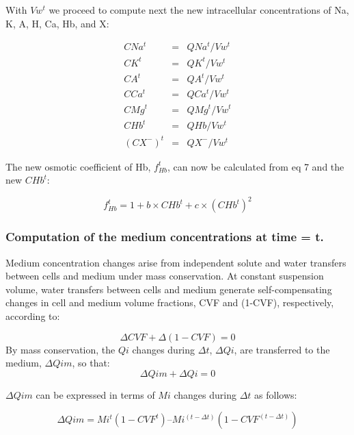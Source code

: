 \documentclass[a4paper]{article}
\newcommand{\cell}[1]{C#1}
\newcommand{\CNa}{\cell{Na}}
\newcommand{\CK}{\cell{K}}
\newcommand{\CA}{\cell{A}}
\newcommand{\CHb}{\cell{Hb}}
\newcommand{\CCa}{\cell{Ca}}
\newcommand{\CMg}{\cell{Mg}}
\newcommand{\CX}{\cell{X}}
\begin{document}
With $Vw^t$ we proceed to compute next the new intracellular concentrations of Na, K, A, H, Ca, Hb, and X:

\setcounter{equation}{0}
\renewcommand{\theequation}{24\alph{equation}}

\begin{eqnarray}
\CNa^t &=& QNa^t/Vw^t \\
\CK^t &=& QK^t/Vw^t \\
\CA^t &=& QA^t/Vw^t  \\
\CCa^t &=& QCa^t/Vw^t  \\
\CMg^t &=& QMg^t/Vw^t  \\
\CHb^t &=& QHb/Vw^t \\
(\CX^{-})^t &=& QX^{-} /Vw^t  
\end{eqnarray}

The new osmotic coefficient of Hb, $f_{Hb}^t$, can now be calculated from eq 7 and the new $\CHb^t$:

\setcounter{equation}{24}
\renewcommand{\theequation}{\arabic{equation}}

\begin{equation}
f_{Hb}^t = 1 + b\times\CHb^t + c\times (CHb^t)^2
\end{equation}

\subsubsection{Computation of the medium concentrations at time = t.}
Medium concentration changes arise from independent solute and water transfers between cells and medium under mass conservation.  At constant suspension volume, water transfers between cells and medium generate self-compensating changes in cell and medium volume fractions, CVF and (1-CVF), respectively, according to:

\setcounter{equation}{0}
\renewcommand{\theequation}{26\alph{equation}}

\begin{equation}
\Delta CVF + \Delta (1-CVF) = 0
\end{equation}
By mass conservation, the $Qi$ changes during $\Delta t$, $\Delta Qi$, are transferred to the medium, $\Delta Qim$, so that:
\begin{equation}
\Delta Qim + \Delta Qi = 0  
\end{equation}

$\Delta Qim$ can be expressed in terms of $Mi$ changes during $\Delta t$ as follows:

\begin{equation}
\Delta Qim = Mi^t(1-CVF^t) – Mi^{(t-\Delta t)}(1-CVF^{(t-\Delta t)}) 
\end{equation}
\end{document}
